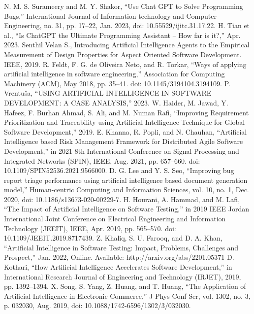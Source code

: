 \documentclass[conference]{IEEEtran}
\begin{document}
\begin{thebibliography}{00}
 N. M. S. Surameery and M. Y. Shakor, “Use Chat GPT to Solve Programming Bugs,” International Journal of Information technology and Computer Engineering, no. 31, pp. 17–22, Jan. 2023, doi: 10.55529/ijitc.31.17.22. 
 H. Tian et al., “Is ChatGPT the Ultimate Programming Assistant -- How far is it?,” Apr. 2023. 
 Senthil Velan S., Introducing Artificial Intelligence Agents to the Empirical Measurement of Design Properties for Aspect Oriented Software Development. IEEE, 2019. 
 R. Feldt, F. G. de Oliveira Neto, and R. Torkar, “Ways of applying artificial intelligence in software engineering,” Association for Computing Machinery (ACM), May 2018, pp. 35–41. doi: 10.1145/3194104.3194109. 
 P. Vrentuša, “USING ARTIFICIAL INTELLIGENCE IN SOFTWARE DEVELOPMENT: A CASE ANALYSIS,” 2023. 
 W. Haider, M. Jawad, Y. Hafeez, F. Burhan Ahmad, S. Ali, and M. Numan Rafi, “Improving Requirement Prioritization and Traceability using Artificial Intelligence Technique for Global Software Development,” 2019. 
 E. Khanna, R. Popli, and N. Chauhan, “Artificial Intelligence based Risk Management Framework for Distributed Agile Software Development,” in 2021 8th International Conference on Signal Processing and Integrated Networks (SPIN), IEEE, Aug. 2021, pp. 657–660. doi: 10.1109/SPIN52536.2021.9566000. 
 D. G. Lee and Y. S. Seo, “Improving bug report triage performance using artificial intelligence based document generation model,” Human-centric Computing and Information Sciences, vol. 10, no. 1, Dec. 2020, doi: 10.1186/s13673-020-00229-7. 
 H. Hourani, A. Hammad, and M. Lafi, “The Impact of Artificial Intelligence on Software Testing,” in 2019 IEEE Jordan International Joint Conference on Electrical Engineering and Information Technology (JEEIT), IEEE, Apr. 2019, pp. 565–570. doi: 10.1109/JEEIT.2019.8717439. 
 Z. Khaliq, S. U. Farooq, and D. A. Khan, “Artificial Intelligence in Software Testing: Impact, Problems, Challenges and Prospect,” Jan. 2022, {Online}. Available: http://arxiv.org/abs/2201.05371 
 D. Kothari, “How Artificial Intelligence Accelerates Software Development,” in International Research Journal of Engineering and Technology (IRJET), 2019, pp. 1392–1394. 
 X. Song, S. Yang, Z. Huang, and T. Huang, “The Application of Artificial Intelligence in Electronic Commerce,” J Phys Conf Ser, vol. 1302, no. 3, p. 032030, Aug. 2019, doi: 10.1088/1742-6596/1302/3/032030. 

\end{thebibliography}
\end{document}
